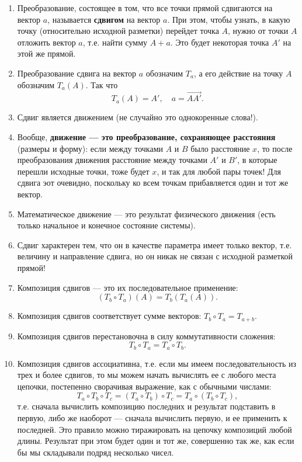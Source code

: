 \begin{enumerate}
\item Преобразование, состоящее в том, что все точки прямой сдвигаются на вектор $a$, называется \textbf{сдвигом} на вектор $a$. При этом, чтобы узнать, в какую точку (относительно исходной разметки) перейдет точка $A$, нужно от точки $A$ отложить вектор $a$, т.е. найти сумму $A+a$. Это будет некоторая точка $A'$ на этой же прямой.
\item Преобразование сдвига на вектор $a$ обозначим $T_a$, а его действие на точку $A$ обозначим $T_a(A)$. Так что
$$
T_a(A)=A',\quad a=\vec{AA'}.
$$
\item Сдвиг является движением (не случайно это однокоренные слова!).
\item Вообще, \textbf{движение --- это преобразование, сохраняющее расстояния} (размеры и форму): если между точками $A$ и $B$ было расстояние $x$, то после преобразования движения расстояние между точками $A'$ и $B'$, в которые перешли исходные точки, тоже будет $x$, и так для любой пары точек! Для сдвига эот очевидно, поскольку ко всем точкам прибавляется один и тот же вектор.
\item Математическое движение --- это результат физического движения (есть только начальное и конечное состояние системы).
\item Сдвиг характерен тем, что он в качестве параметра имеет только вектор, т.е. величину и направление сдвига, но он никак не связан с исходной разметкой прямой!
\item Композиция сдвигов --- это их последовательное применение:
\begin{equation}\label{Tcomposition}
(T_b\circ T_a)(A)=T_b(T_a(A)).
\end{equation}
\item Композиция сдвигов соответствует сумме векторов: $T_b\circ T_a=T_{a+b}$.
\item Композиция сдвигов перестановочна в силу коммутативности сложения: $$T_b\circ T_a=T_a\circ T_b.$$
\item Композиция сдвигов ассоциативна, т.е. если мы имеем последовательность из трех и более сдвигов, то мы можем начать вычислять ее с любого места цепочки, постепенно сворачивая выражение, как с обычными числами:
$$
T_a\circ T_b\circ T_c = (T_a\circ T_b)\circ T_c = T_a\circ (T_b\circ T_c),
$$
т.е. сначала вычислить композицию последних и результат подставить в первую, либо же наоборот --- сначала вычислить первую, и ее применить к последней. Это правило можно тиражировать на цепочку композиций любой длины. Результат при этом будет один и тот же, совершенно так же, как если бы мы складывали подряд несколько чисел.

\end{enumerate}
